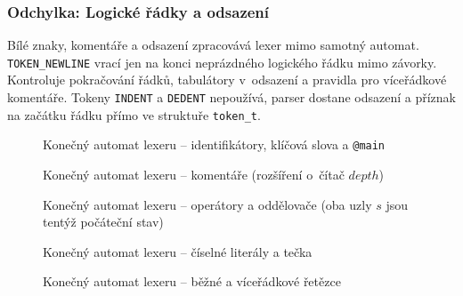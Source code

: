 \subsubsection*{Odchylka: Logické řádky a odsazení}
Bílé znaky, komentáře a odsazení zpracovává lexer mimo samotný automat.
\texttt{TOKEN\_NEWLINE} vrací jen na konci neprázdného logického řádku mimo
závorky. Kontroluje pokračování řádků, tabulátory v~odsazení a pravidla pro
víceřádkové komentáře. Tokeny \texttt{INDENT} a \texttt{DEDENT} nepoužívá,
parser dostane odsazení a příznak na začátku řádku přímo ve struktuře
\texttt{token\_t}.


\begin{figure}[htbp]
  \centering
  
  \caption{Konečný automat lexeru -- identifikátory, klíčová slova
           a \texttt{@main}}
  \label{fig:ka-id}
\end{figure}

\begin{figure}[htbp]
  \centering
  
  \caption{Konečný automat lexeru -- komentáře
           (rozšíření o~čítač $\mathit{depth}$)}
  \label{fig:ka-komentare}
\end{figure}

\begin{figure}[htbp]
  \centering
  
  \caption{Konečný automat lexeru -- operátory a oddělovače
           (oba uzly $s$ jsou tentýž počáteční stav)}
  \label{fig:ka-op}
\end{figure}

\begin{figure}[htbp]
  \centering
  
  \caption{Konečný automat lexeru -- číselné literály a tečka}
  \label{fig:ka-cisla}
\end{figure}

\begin{figure}[htbp]
  \centering
  
  \caption{Konečný automat lexeru -- běžné a víceřádkové řetězce}
  \label{fig:ka-retezce}
\end{figure}
